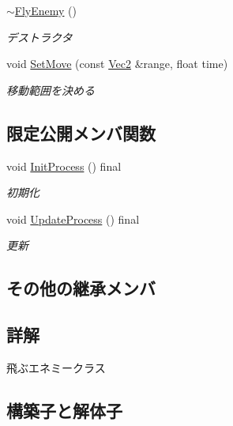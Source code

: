 \begin{DoxyCompactItemize}
\mbox{\hyperlink{class_fly_enemy_ae4345f89a659b559c08d0bb879db7158}{$\sim$\+Fly\+Enemy}} ()
\begin{DoxyCompactList}\small\item\em デストラクタ \end{DoxyCompactList}\item 
void \mbox{\hyperlink{class_fly_enemy_afc4616eb4d12d3b7c401f35002812330}{Set\+Move}} (const \mbox{\hyperlink{common_8h_ae148fff5818e9444b4ab2288829559bf}{Vec2}} \&range, float time)
\begin{DoxyCompactList}\small\item\em 移動範囲を決める \end{DoxyCompactList}\end{DoxyCompactItemize}
\subsection*{限定公開メンバ関数}
\begin{DoxyCompactItemize}
\item 
void \mbox{\hyperlink{class_fly_enemy_afe4ddbf7089952146443f4ca71f55b13}{Init\+Process}} () final
\begin{DoxyCompactList}\small\item\em 初期化 \end{DoxyCompactList}\item 
void \mbox{\hyperlink{class_fly_enemy_a5122c8fea26ebbd0390acfd6e41931ff}{Update\+Process}} () final
\begin{DoxyCompactList}\small\item\em 更新 \end{DoxyCompactList}\end{DoxyCompactItemize}
\subsection*{その他の継承メンバ}


\subsection{詳解}
飛ぶエネミークラス 

\subsection{構築子と解体子}
\mbox{\label{class_fly_enemy_a92bb66e1f877440afab15a36ffebd74d}} 
